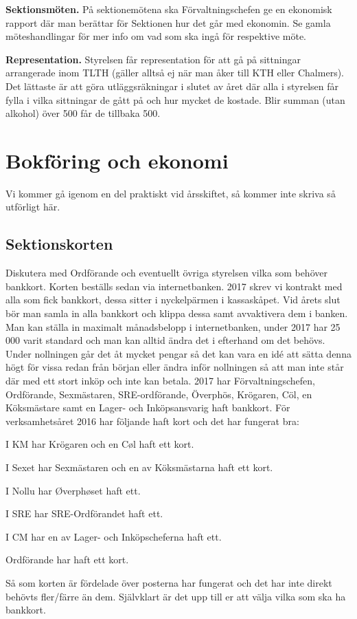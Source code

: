 \documentclass[10pt]{article}
\begin{document}
\textbf{Sektionsmöten.} På sektionemötena ska Förvaltningschefen ge en ekonomisk rapport där man berättar för Sektionen hur det går med ekonomin. Se gamla möteshandlingar för mer info om vad som ska ingå för respektive möte.

\textbf{Representation.} Styrelsen får representation för att gå på sittningar arrangerade inom TLTH (gäller alltså ej när man åker till KTH eller Chalmers). Det lättaste är att göra utläggsräkningar i slutet av året där alla i styrelsen får fylla i vilka sittningar de gått på och hur mycket de kostade. Blir summan (utan alkohol) över 500 får de tillbaka 500.

\section{Bokföring och ekonomi}
Vi kommer gå igenom en del praktiskt vid årsskiftet, så kommer inte skriva så utförligt här.

\subsection{Sektionskorten}
Diskutera med Ordförande och eventuellt övriga styrelsen vilka som behöver bankkort. Korten beställs sedan via internetbanken. 2017 skrev vi kontrakt med alla som fick bankkort, dessa sitter i nyckelpärmen i kassaskåpet. Vid årets slut bör man samla in alla bankkort och klippa dessa samt avvaktivera dem i banken. Man kan ställa in maximalt månadsbelopp i internetbanken, under 2017 har 25 000 varit standard och man kan alltid ändra det i efterhand om det behövs. Under nollningen går det åt mycket pengar så det kan vara en idé att sätta denna högt för vissa redan från början eller ändra inför nollningen så att man inte står där med ett stort inköp och inte kan betala. 2017 har Förvaltningschefen, Ordförande, Sexmästaren, SRE-ordförande, Överphös, Krögaren, Cöl, en Köksmästare samt en Lager- och Inköpsansvarig haft bankkort. För verksamhetsåret 2016 har följande haft kort och det har fungerat bra:

\begin{dashlist}
\item I KM har Krögaren och en Cøl haft ett kort.
\item I Sexet har Sexmästaren och en av Köksmästarna haft ett kort.
\item I Nollu har Øverphøset haft ett.
\item I SRE har SRE-Ordförandet haft ett.
\item I CM har en av Lager- och Inköpscheferna haft ett.
\item Ordförande har haft ett kort.
\end{dashlist}
Så som korten är fördelade över posterna har fungerat och det har inte direkt behövts fler/färre än dem. Självklart är det upp till er att välja vilka som ska ha bankkort.
\end{document}
